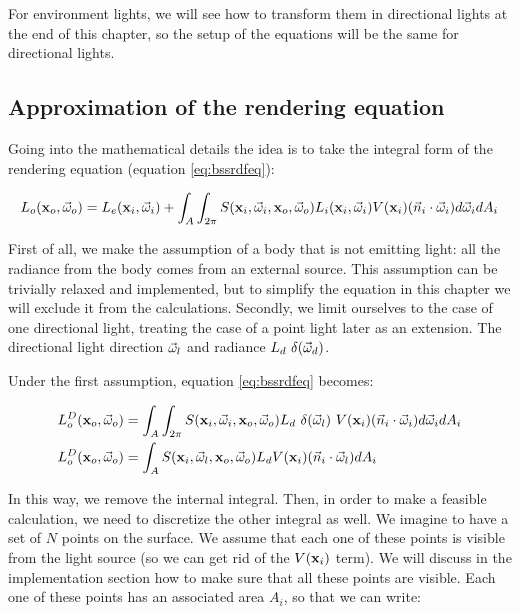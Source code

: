 For environment lights, we will see how to transform them in directional lights at the end of this chapter, so the setup of the equations will be the same for directional lights.

\subsection{Approximation of the rendering equation}

Going into the mathematical details the idea is to take the integral form of the rendering equation (equation \ref{eq:bssrdfeq}):

\begin{equation*}
L_o(\mathbf{x}_o,\vec{\omega}_o) = L_e(\mathbf{x}_i,\vec{\omega}_i) + \int_A \int_{2\pi} S(\mathbf{x}_i, \vec{\omega}_i, \mathbf{x}_o, \vec{\omega}_o) L_i(\mathbf{x}_i,\vec{\omega}_i) V(\mathbf{x}_i) (\vec{n}_i \cdot \vec{\omega}_i) d\vec{\omega}_i d A_i
\end{equation*}

First of all, we make the assumption of a body that is not emitting light: all the radiance from the body comes from an external source. This assumption can be trivially relaxed and implemented, but to simplify the equation in this chapter we will exclude it from the calculations. Secondly, we limit ourselves to the case of one directional light, treating the case of a point light later as an extension. The directional light direction $\vec{\omega}_l$ and radiance $L_d \ \delta(\vec{\omega}_d)$.

Under the first assumption, equation \ref{eq:bssrdfeq} becomes:

\begin{equation*}
\begin{split}
L_o^D(\mathbf{x}_o,\vec{\omega}_o) &= \int_A \int_{2\pi} S(\mathbf{x}_i, \vec{\omega}_i, \mathbf{x}_o, \vec{\omega}_o) L_d \ \delta(\vec{\omega}_l)\ V(\mathbf{x}_i) (\vec{n}_i \cdot \vec{\omega}_i) d\vec{\omega}_i d A_i \\
L_o^D(\mathbf{x}_o,\vec{\omega}_o) &= \int_A S(\mathbf{x}_i, \vec{\omega}_l, \mathbf{x}_o, \vec{\omega}_o) L_d  V(\mathbf{x}_i) (\vec{n}_i \cdot \vec{\omega}_l) d A_i 
\end{split}
\end{equation*}

In this way, we remove the internal integral. Then, in order to make a feasible calculation, we need to discretize the other integral as well. We imagine to have a set of $N$ points on the surface. We assume that each one of these points is visible from the light source (so we can get rid of the $V(\mathbf{x}_i)$ term). We will discuss in the implementation section how to make sure that all these points are visible. Each one of these points has an associated area $A_i$, so that we can write:

